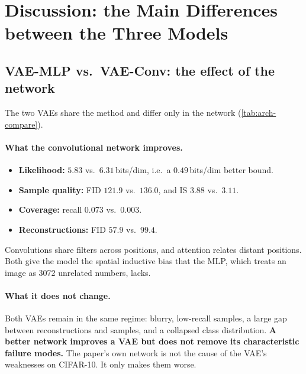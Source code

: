 \section{Discussion: the Main Differences between the Three Models}
\label{sec:discussion}

\subsection{VAE-MLP vs.\ VAE-Conv: the effect of the network}
The two VAEs share the method and differ only in the network (\cref{tab:arch-compare}).

\paragraph{What the convolutional network improves.}
\begin{itemize}
  \item \textbf{Likelihood:} $5.83$ vs.\ $6.31$\,bits/dim, i.e.\ a $0.49$\,bits/dim better bound.
  \item \textbf{Sample quality:} FID $121.9$ vs.\ $136.0$, and IS $3.88$ vs.\ $3.11$.
  \item \textbf{Coverage:} recall $0.073$ vs.\ $0.003$.
  \item \textbf{Reconstructions:} FID $57.9$ vs.\ $99.4$.
\end{itemize}
Convolutions share filters across positions, and attention relates distant positions. Both give the model the
spatial inductive bias that the MLP, which treats an image as 3072 unrelated numbers, lacks.

\paragraph{What it does not change.} Both VAEs remain in the same regime: blurry, low-recall samples, a large gap
between reconstructions and samples, and a collapsed class distribution. \textbf{A better network improves a VAE
but does not remove its characteristic failure modes.} The paper's own network is not the cause of the VAE's
weaknesses on CIFAR-10. It only makes them worse.

